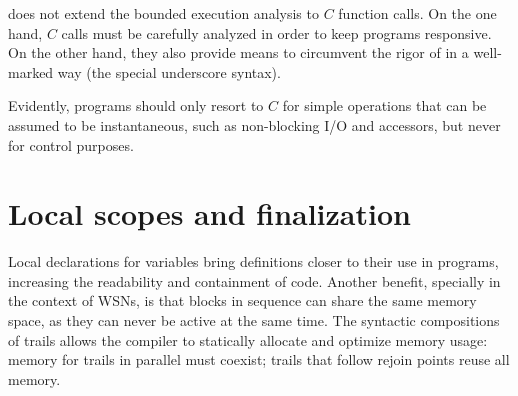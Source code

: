 \CEU does not extend the bounded execution analysis to $C$ function calls. 
On the one hand, $C$ calls must be carefully analyzed in order to keep programs 
responsive.
On the other hand, they also provide means to circumvent the rigor of \CEU in a 
well-marked way (the special underscore syntax).
%

%
Evidently, programs should only resort to $C$ for simple operations that can be 
assumed to be instantaneous, such as non-blocking I/O and  
accessors, but never for control purposes.

\section{Local scopes and finalization}
\label{sec.ceu.fins}

Local declarations for variables bring definitions closer to their use in 
programs, increasing the readability and containment of code.
Another benefit, specially in the context of WSNs, is that blocks in sequence 
can share the same memory space, as they can never be active at the same time.
%
The syntactic compositions of trails allows the \CEU compiler to statically 
allocate and optimize memory usage:
memory for trails in parallel must coexist;
trails that follow rejoin points reuse all memory.

